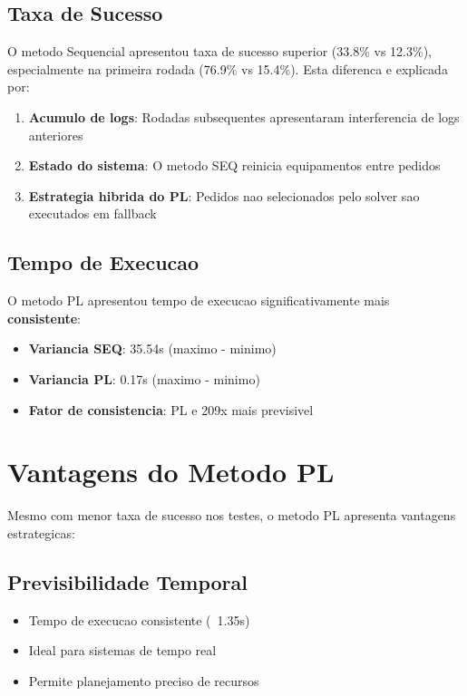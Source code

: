 \documentclass[12pt,a4paper]{article}
\begin{document}
\subsection{Taxa de Sucesso}

O metodo Sequencial apresentou taxa de sucesso superior (33.8\% vs 12.3\%), especialmente na primeira rodada (76.9\% vs 15.4\%). Esta diferenca e explicada por:

\begin{enumerate}
    \item \textbf{Acumulo de logs}: Rodadas subsequentes apresentaram interferencia de logs anteriores
    \item \textbf{Estado do sistema}: O metodo SEQ reinicia equipamentos entre pedidos
    \item \textbf{Estrategia hibrida do PL}: Pedidos nao selecionados pelo solver sao executados em fallback
\end{enumerate}

\subsection{Tempo de Execucao}

O metodo PL apresentou tempo de execucao significativamente mais \textbf{consistente}:

\begin{itemize}
    \item \textbf{Variancia SEQ}: 35.54s (maximo - minimo)
    \item \textbf{Variancia PL}: 0.17s (maximo - minimo)
    \item \textbf{Fator de consistencia}: PL e 209x mais previsivel
\end{itemize}

\section{Vantagens do Metodo PL}

Mesmo com menor taxa de sucesso nos testes, o metodo PL apresenta vantagens estrategicas:

\subsection{Previsibilidade Temporal}

\begin{itemize}
    \item Tempo de execucao consistente (~1.35s)
    \item Ideal para sistemas de tempo real
    \item Permite planejamento preciso de recursos
\end{itemize}
\end{document}
